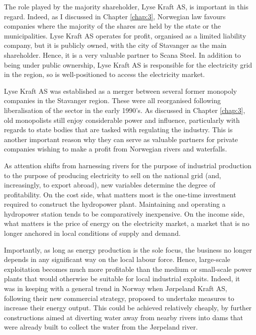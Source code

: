 The role played by the majority shareholder, Lyse Kraft AS, is important in this regard. Indeed, as I discussed in Chapter \ref{chap:3}, Norwegian law favours companies where the majority of the shares are held by the state or the municipalities. Lyse Kraft AS operates for profit, organised as a limited liability company, but it is publicly owned, with the city of Stavanger as the main shareholder. Hence, it is a very valuable partner to Scana Steel. In addition to being under public ownership, Lyse Kraft AS is responsible for the electricity grid in the region, so is well-positioned to access the electricity market.

Lyse Kraft AS was established as a merger between several former monopoly companies in the Stavanger region. These were all reorganised following liberalisation of the sector in the early 1990's. As discussed in Chapter \ref{chap:3}, old monopolists still enjoy considerable power and influence, particularly with regards to state bodies that are tasked with regulating the industry. This is another important reason why they can serve as valuable partners for private companies wishing to make a profit from Norwegian rivers and waterfalls.

As attention shifts from harnessing rivers for the purpose of industrial production to the purpose of producing electricity to sell on the national grid (and, increasingly, to export abroad), new variables determine the degree of profitability. On the cost side, what matters most is the one-time investment required to construct the hydropower plant. Maintaining and operating a hydropower station tends to be comparatively inexpensive. On the income side, what matters is the price of energy on the electricity market, a market that is no longer anchored in local conditions of supply and demand.

Importantly, as long as energy production is the sole focus, the business no longer depends in any significant way on the local labour force. Hence, large-scale exploitation becomes much more profitable than the medium or small-scale power plants that would otherwise be suitable for local industrial exploits. Indeed, it was in keeping with a general trend in Norway when Jørpeland Kraft AS, following  their new commercial strategy, proposed to undertake measures to increase their energy output. This could be achieved relatively cheaply, by further constructions aimed at diverting water away from nearby rivers into dams that were already built to collect the water from the Jørpeland river.


